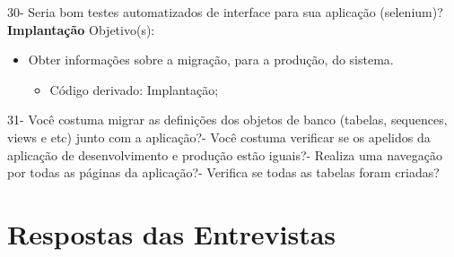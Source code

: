 \begin{apendicesenv}
30- Seria bom testes automatizados de interface para sua aplicação (selenium)?\newline
\newline
\textbf{Implantação}\newline\newline
Objetivo(s):
\begin{itemize}
	\item Obter informações sobre a migração, para a produção, do sistema.
	\begin{itemize}
		\item Código derivado: Implantação;
	\end{itemize}
\end{itemize}
31- Você costuma migrar as definições dos objetos de banco (tabelas, sequences, views e etc) junto com a aplicação?- Você costuma verificar se os apelidos da aplicação de desenvolvimento e produção estão iguais?- Realiza uma navegação por todas as páginas da aplicação?- Verifica se todas as tabelas foram criadas?\newline
\newline
\chapter{Respostas das Entrevistas}

\begin{comment}
\begin{itemize}
\item \textbf{Desenvolvedor 1}
\end{itemize}

\textbf{Descrição do Desenvolvedor}

\begin{enumerate}
\item Qual é o curso que você faz?\newline
- Resposta 1
\item Quantos semestres são o curso?\newline
- Resposta 2
\item Está em qual semestre do curso?\newline
- Resposta 3
\item Qual é o nome da instituição de ensino?\newline
- Resposta 4
\item Quanto tempo de estágio?\newline
- Resposta 5
\end{enumerate}


\end{comment}
\end{apendicesenv}
